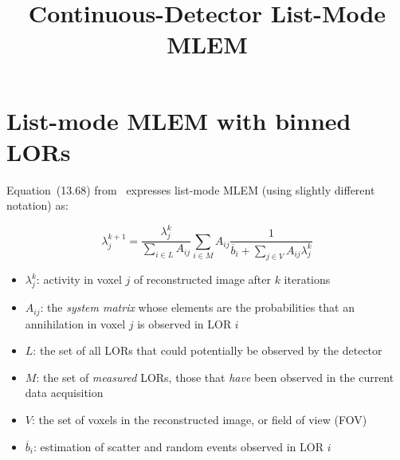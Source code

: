 \documentclass[10pt, a4paper, twocolumn]{article} %
\title{Continuous-Detector List-Mode MLEM} %
\date{} %
\begin{document}
\maketitle %

\thispagestyle{firstpage} %




\section{List-mode MLEM with binned LORs}

Equation~(13.68) from~\citep{Handbook} expresses list-mode MLEM (using slightly
different notation) as:


\begin{equation}
  \label{eq:mlem}
  \lambda_{j}^{k+1} =
  \frac
  {\lambda_j^{k}}
  {\displaystyle\sum_{i\in L} A_{ij}}
  {\displaystyle\sum_{{i\in M}}A_{ij}}
  \frac{1}
  {\overline{b}_{i} + \displaystyle\sum_{j\in V}A_{ij}\lambda_{j}^{k}}
\end{equation}
\begin{itemize}
  \item
  \(\lambda_{j}^{k}\): activity in voxel \(j\) of reconstructed image after \(k\) iterations
  \item
  \(A_{ij}\): the \textit{system matrix} whose elements are the
  probabilities that an annihilation in voxel \(j\) is observed in LOR
  \(i\)
  \item
  \(L\): the set of all LORs that could potentially be observed by the detector
  \item
  \(M\): the set of \textit{measured} LORs, those that \textit{have} been observed in the current data acquisition
  \item
  \(V\): the set of voxels in the reconstructed image, or field of view (FOV)
  \item
  \(\overline{b}_{i}\): estimation of scatter and random events observed in LOR \(i\)
\end{itemize}
\end{document}
